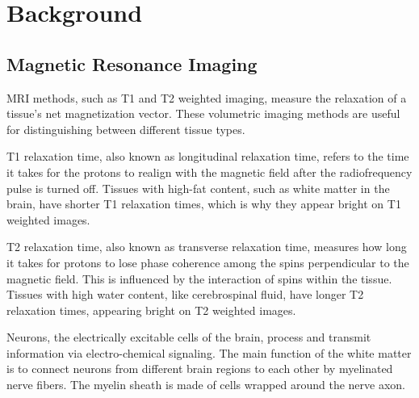\section{Background}

\subsection{Magnetic Resonance Imaging}

\ac{MRI} methods, such as T1 and T2 weighted imaging, measure the relaxation of a tissue's net magnetization vector. \cite{t1} These volumetric imaging methods are useful for distinguishing between different tissue types.\par
T1 relaxation time, also known as longitudinal relaxation time, refers to the time it takes for the protons to realign with the magnetic field after the radiofrequency pulse is turned off. Tissues with high-fat content, such as white matter in the brain, have shorter T1 relaxation times, which is why they appear bright on T1 weighted images. \cite{t1t2}\par
T2 relaxation time, also known as transverse relaxation time, measures how long it takes for protons to lose phase coherence among the spins perpendicular to the magnetic field. This is influenced by the interaction of spins within the tissue. Tissues with high water content, like cerebrospinal fluid, have longer T2 relaxation times, appearing bright on T2 weighted images. \cite{t1t2}\par

Neurons, the electrically excitable cells of the brain, process and transmit information via electro-chemical signaling. \cite{brain} The main function of the white matter is to connect neurons from different brain regions to each other by myelinated nerve fibers. \cite{white} The myelin sheath is made of cells wrapped around the nerve axon. \cite{myelin}\par

